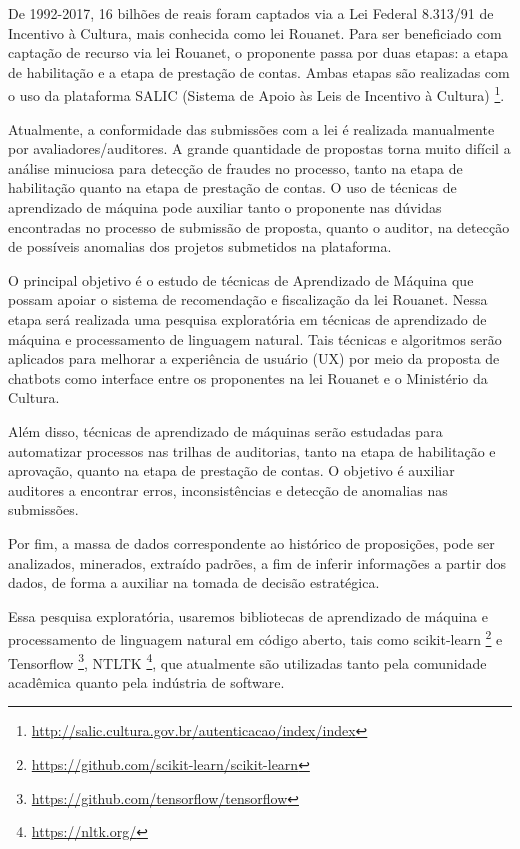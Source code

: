 De  1992-2017, 16 bilhões de reais foram captados via a Lei Federal 8.313/91 de 
Incentivo à Cultura, mais conhecida como lei Rouanet. Para ser beneficiado com 
captação de recurso via lei Rouanet, o proponente passa por duas etapas: a  etapa 
de habilitação e a etapa  de prestação de contas. Ambas etapas são realizadas 
com o uso da plataforma SALIC (Sistema de Apoio às Leis de Incentivo à Cultura)
\footnote{\url{http://salic.cultura.gov.br/autenticacao/index/index}}. 

Atualmente, a conformidade das submissões com a lei é realizada manualmente por 
avaliadores/auditores. A grande quantidade de propostas torna muito difícil 
a análise minuciosa para detecção de fraudes no processo, tanto na etapa de 
habilitação quanto na etapa de prestação de contas. O uso de técnicas de 
aprendizado de máquina pode auxiliar tanto o proponente nas dúvidas encontradas 
no processo de submissão de proposta, quanto o auditor, na detecção de possíveis 
anomalias dos projetos submetidos na plataforma.

O principal objetivo é o estudo de técnicas de Aprendizado de Máquina que possam 
apoiar o sistema de recomendação e fiscalização da lei Rouanet. Nessa etapa será realizada 
uma pesquisa exploratória em técnicas de aprendizado de máquina e processamento 
de linguagem natural. Tais técnicas e algoritmos serão aplicados para melhorar a 
experiência de usuário (UX) por meio da proposta de chatbots como interface entre 
os proponentes na lei Rouanet e o Ministério da Cultura. 

Além disso, técnicas de aprendizado de máquinas serão estudadas para automatizar 
processos nas trilhas de auditorias, tanto na etapa de habilitação e aprovação, 
quanto na etapa de prestação de contas. O objetivo é auxiliar auditores a 
encontrar erros, inconsistências e detecção de anomalias nas submissões. 

Por fim, a massa de dados correspondente ao histórico de proposições, pode ser 
analizados, minerados, extraído padrões, a fim de inferir informações
a partir dos dados, de forma a auxiliar na tomada de decisão estratégica.

Essa pesquisa exploratória, usaremos bibliotecas de aprendizado de máquina e 
processamento de linguagem natural em código aberto, tais como scikit-learn 
\footnote{\url{https://github.com/scikit-learn/scikit-learn}} e Tensorflow 
\footnote{\url{https://github.com/tensorflow/tensorflow}}, NTLTK
\footnote{\url{https://nltk.org/}}, que atualmente são 
utilizadas tanto pela comunidade acadêmica quanto pela indústria de software.  

